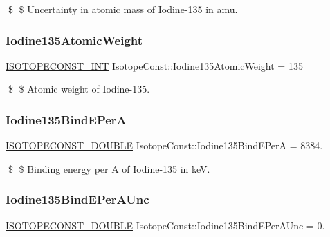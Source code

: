 \$ \$ Uncertainty in atomic mass of Iodine-\/135 in amu. \mbox{\label{group___isotope_const-_iodine-_i135_ga73d869f7a4fbb7b9812ec4e117586421}} 
\subsubsection{\texorpdfstring{Iodine135\+Atomic\+Weight}{Iodine135AtomicWeight}}
{\footnotesize\ttfamily \mbox{\hyperlink{group___isotope_const-_macros_ga5f18360b3e99483a35c32d789e62621c}{I\+S\+O\+T\+O\+P\+E\+C\+O\+N\+S\+T\+\_\+\+I\+NT}} Isotope\+Const\+::\+Iodine135\+Atomic\+Weight = 135}

\$ \$ Atomic weight of Iodine-\/135. \mbox{\label{group___isotope_const-_iodine-_i135_gae704abb98df325452852a896bcfc9ae9}} 
\subsubsection{\texorpdfstring{Iodine135\+Bind\+E\+PerA}{Iodine135BindEPerA}}
{\footnotesize\ttfamily \mbox{\hyperlink{group___isotope_const-_macros_ga8f45a7272ce02c0b4c65c44636ed719a}{I\+S\+O\+T\+O\+P\+E\+C\+O\+N\+S\+T\+\_\+\+D\+O\+U\+B\+LE}} Isotope\+Const\+::\+Iodine135\+Bind\+E\+PerA = 8384.}

\$ \$ Binding energy per A of Iodine-\/135 in keV. \mbox{\label{group___isotope_const-_iodine-_i135_ga4c36143a0b27e20d23408a13c89c1c15}} 
\subsubsection{\texorpdfstring{Iodine135\+Bind\+E\+Per\+A\+Unc}{Iodine135BindEPerAUnc}}
{\footnotesize\ttfamily \mbox{\hyperlink{group___isotope_const-_macros_ga8f45a7272ce02c0b4c65c44636ed719a}{I\+S\+O\+T\+O\+P\+E\+C\+O\+N\+S\+T\+\_\+\+D\+O\+U\+B\+LE}} Isotope\+Const\+::\+Iodine135\+Bind\+E\+Per\+A\+Unc = 0.}

